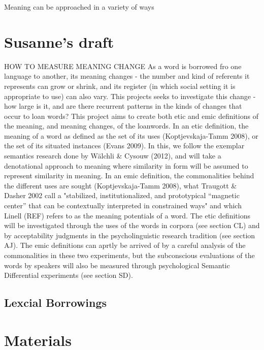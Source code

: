 \documentclass[a4paper]{article}
\begin{document}
Meaning can be approached in a variety of ways \citep{Koptjevskaja-Tamm2008}


\section{Susanne's draft}
HOW TO MEASURE MEANING CHANGE
As a word is borrowed fro one language to another, its meaning changes - the number and kind of referents it represents can grow or shrink, and its register (in which social setting it is appropriate to use) can also vary. This projects seeks to investigate this change - how large is it, and are there recurrent patterns in the kinds of changes that occur to loan words? 
This project aims to create both etic and emic definitions of the meaning, and meaning changes, of the loanwords. In an etic definition, the meaning of a word as defined as the set of its uses (Koptjevskaja-Tamm 2008), or the set of its situated instances (Evans 2009). In this, we follow the exemplar semantics research done by Wälchli \& Cysouw (2012), and will take a denotational approach to meaning where similarity in form will be assumed to represent similarity in meaning. In an emic definition, the commonalities behind the different uses are sought (Koptjevskaja-Tamm 2008), what Traugott \& Dasher 2002 call a "stabilized, institutionalized, and prototypical “magnetic center” that can be contextually interpreted in constrained ways" and which Linell (REF) refers to as the meaning potentials of a word.
The etic definitions will be investigated through the uses of the words in corpora (see section CL) and by acceptability judgments in the psycholinguistic research tradition (see section AJ). The emic definitions can aprtly be arrived of by a careful analysis of the commonalities in these two experiments, but the subconscious evaluations of the words by speakers will also be measured through psychological Semantic Differential experiments (see section SD).


\subsection{Lexcial Borrowings}

\citet{Matras2009}

\section{Materials} 
\end{document}
